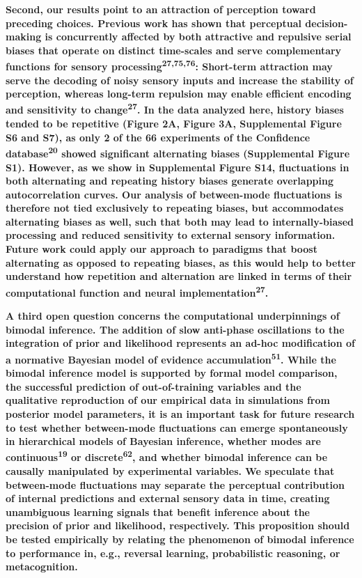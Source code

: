 \documentclass[
]{article}
\begin{document}
\textbf{Second, our results point to an attraction of perception toward
preceding choices. Previous work has shown that perceptual
decision-making is concurrently affected by both attractive and
repulsive serial biases that operate on distinct time-scales and serve
complementary functions for sensory
processing\textsuperscript{27,75,76}: Short-term attraction may serve
the decoding of noisy sensory inputs and increase the stability of
perception, whereas long-term repulsion may enable efficient encoding
and sensitivity to change\textsuperscript{27}. In the data analyzed
here, history biases tended to be repetitive (Figure 2A, Figure 3A,
Supplemental Figure S6 and S7), as only 2 of the 66 experiments of the
Confidence database\textsuperscript{20} showed significant alternating
biases (Supplemental Figure S1). However, as we show in Supplemental
Figure S14, fluctuations in both alternating and repeating history
biases generate overlapping autocorrelation curves. Our analysis of
between-mode fluctuations is therefore not tied exclusively to repeating
biases, but accommodates alternating biases as well, such that both may
lead to internally-biased processing and reduced sensitivity to external
sensory information. Future work could apply our approach to paradigms
that boost alternating as opposed to repeating biases, as this would
help to better understand how repetition and alternation are linked in
terms of their computational function and neural
implementation\textsuperscript{27}.}

\textbf{A third open question concerns the computational underpinnings
of bimodal inference. The addition of slow anti-phase oscillations to
the integration of prior and likelihood represents an ad-hoc
modification of a normative Bayesian model of evidence
accumulation\textsuperscript{51}. While the bimodal inference model is
supported by formal model comparison, the successful prediction of
out-of-training variables and the qualitative reproduction of our
empirical data in simulations from posterior model parameters, it is an
important task for future research to test whether between-mode
fluctuations can emerge spontaneously in hierarchical models of Bayesian
inference, whether modes are continuous\textsuperscript{19} or
discrete\textsuperscript{62}, and whether bimodal inference can be
causally manipulated by experimental variables. We speculate that
between-mode fluctuations may separate the perceptual contribution of
internal predictions and external sensory data in time, creating
unambiguous learning signals that benefit inference about the precision
of prior and likelihood, respectively. This proposition should be tested
empirically by relating the phenomenon of bimodal inference to
performance in, e.g., reversal learning, probabilistic reasoning, or
metacognition.}
\end{document}
